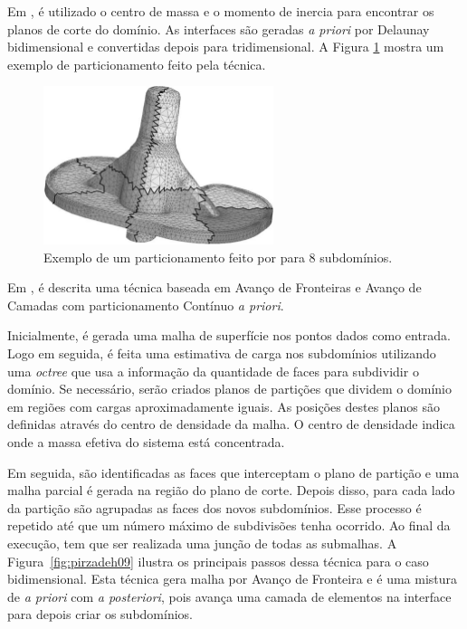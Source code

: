 Em \cite{bib:ANDRA08}, é utilizado o centro de massa e o momento de inercia para encontrar os planos de corte do domínio. As interfaces são geradas \textit{a priori} por Delaunay bidimensional e convertidas depois para tridimensional. A Figura \ref{fig:andra} mostra um exemplo de particionamento feito pela técnica.

 \begin{figure}[htbp]
     \centering
     \includegraphics[width=0.6\textwidth]{fig/andra.png}
     \caption{Exemplo de um particionamento feito por \cite{bib:ANDRA08} para 8 subdomínios.}
     \label{fig:andra}
 \end{figure}


Em \cite{bib:Pirzadeh09}, é descrita uma técnica baseada em Avanço de Fronteiras e Avanço de Camadas com particionamento Contínuo \textit{a priori}.

Inicialmente, é gerada uma malha de superfície nos pontos dados como entrada. Logo em seguida, é feita uma estimativa de carga nos subdomínios utilizando uma \textit{octree} que usa a informação da quantidade de faces para subdividir o domínio. Se necessário, serão criados planos de partições que dividem o domínio em regiões com cargas aproximadamente iguais. As posições destes planos são definidas através do centro de densidade da malha. O centro de densidade indica onde a massa efetiva do sistema está concentrada.

Em seguida, são identificadas as faces que interceptam o plano de partição e uma malha parcial é gerada na região do plano de corte. Depois disso, para cada lado da partição são agrupadas as faces dos novos subdomínios. Esse processo é repetido até que um número máximo de subdivisões tenha ocorrido. Ao final da execução, tem que ser realizada uma junção de todas as submalhas. A Figura~\ref{fig:pirzadeh09} ilustra os principais passos dessa técnica para o caso bidimensional. Esta técnica gera malha por Avanço de Fronteira e é uma mistura de \textit{a priori} com \textit{a posteriori}, pois avança uma camada de elementos na interface para depois criar os subdomínios.

